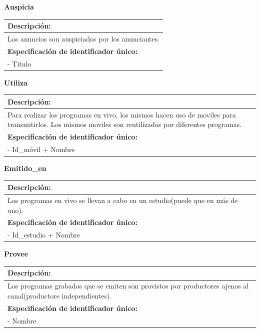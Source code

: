 \documentclass[a4paper,10pt]{article}
\begin{document}
    \begin{flushleft}
      \begin{large} \bf{Auspicia} \end{large}
    \end{flushleft}
      \begin{tabular}{| p{11.4cm} |}
	\hline
	\bf{Descripci\'on:} \\
	\hline
	Los anuncios son auspiciados por los anunciantes. \\
	\hline	
	\bf{Especificaci\'on de identificador \'unico:} \\
	\hline
	- Titulo \\
	\hline
      \end{tabular}

    \begin{flushleft}
      \begin{large} \bf{Utiliza} \end{large}
    \end{flushleft}
      \begin{tabular}{| p{11.4cm} |}
	\hline
	\bf{Descripci\'on:} \\
	\hline
	Para realizar los programas en vivo, los mismos hacen uso de moviles para transmitirlos. Los mismos moviles son reutilizados por diferentes programas. \\
	\hline	
	\bf{Especificaci\'on de identificador \'unico:} \\
	\hline
	- Id\_m\'ovil + Nombre \\
	\hline
      \end{tabular}

    \begin{flushleft}
      \begin{large} \bf{Emitido\_en} \end{large}
    \end{flushleft}
      \begin{tabular}{| p{11.4cm} |}
	\hline
	\bf{Descripci\'on:} \\
	\hline
	Los programas en vivo se llevan a cabo en un estudio(puede que en m\'as de uno). \\	
	\hline
	\bf{Especificaci\'on de identificador \'unico:} \\
	\hline
	- Id\_estudio + Nombre \\
	\hline
      \end{tabular} 
      
    \begin{flushleft}
      \begin{large} \bf{Provee} \end{large}
    \end{flushleft}
      \begin{tabular}{| p{11.4cm} |}
	\hline
	\bf{Descripci\'on:} \\
	\hline
	Los programas grabados que se emiten son provistos por productores ajenos al canal(productore independientes). \\	
	\hline		
	\bf{Especificaci\'on de identificador \'unico:} \\
	\hline
	- Nombre \\
	\hline
      \end{tabular}
\end{document}
